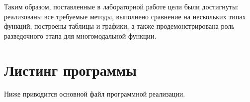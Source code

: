\documentclass[14pt,a4paper]{extarticle}
\begin{document}
Таким образом, поставленные в лабораторной работе цели были достигнуты: реализованы все требуемые методы, выполнено сравнение на нескольких типах функций, построены таблицы и графики, а также продемонстрирована роль разведочного этапа для многомодальной функции.

\appendix

\section{Листинг программы}

Ниже приводится основной файл программной реализации.

\end{document}
